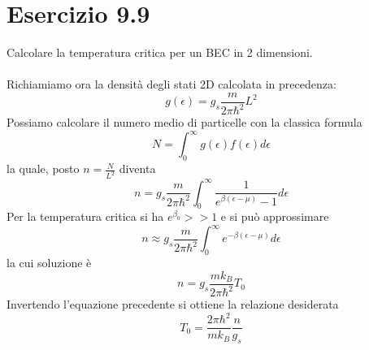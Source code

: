 \documentclass[a4paper]{article}
\begin{document}
    \section*{Esercizio 9.9}
        Calcolare la temperatura critica per un BEC in 2 dimensioni.
        \\
        \\
        Richiamiamo ora la densità degli stati 2D calcolata in precedenza:
        \begin{equation*}
            g(\epsilon)=g_s\frac{m}{2\pi\hbar^2}L^2
        \end{equation*}
        Possiamo calcolare il numero medio di particelle con la classica formula
        \begin{equation*}
            N=\int_0^\infty g(\epsilon)f(\epsilon)d\epsilon
        \end{equation*}
        la quale, posto $n=\frac{N}{L^2}$ diventa
        \begin{equation*}
            n=g_s\frac{m}{2\pi\hbar^2}\int_0^\infty \frac{1}{e^{\beta(\epsilon-\mu)}-1}d\epsilon
        \end{equation*}
        Per la temperatura critica si ha $e^{\beta_0}>>1$ e si può approssimare
        \begin{equation*}
            n\approx g_s\frac{m}{2\pi\hbar^2}\int_0^\infty e^{-\beta(\epsilon-\mu)}d\epsilon
        \end{equation*}
        la cui soluzione è
        \begin{equation*}
            n=g_s\frac{mk_B}{2\pi\hbar^2}T_0
        \end{equation*}
        Invertendo l'equazione precedente si ottiene la relazione desiderata
        \begin{equation*}
            T_0=\frac{2\pi\hbar^2}{mk_B}\frac{n}{g_s}
        \end{equation*}
\end{document}
